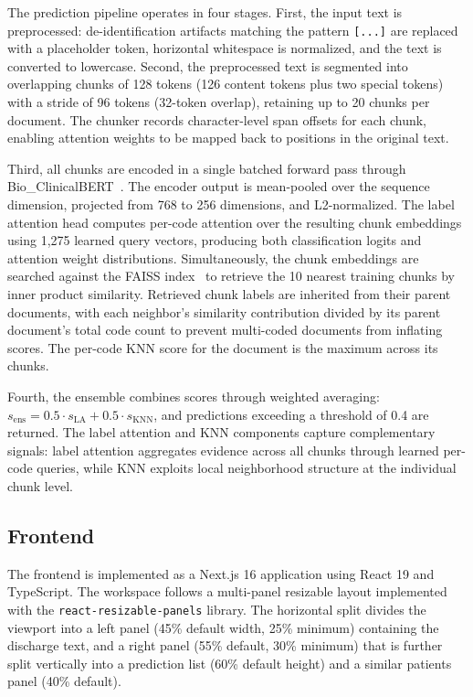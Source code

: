 \documentclass[conference]{IEEEtran}
\begin{document}
The prediction pipeline operates in four stages. First, the input text is preprocessed: de-identification artifacts matching the pattern \texttt{[\textasteriskcentered\textasteriskcentered...\textasteriskcentered\textasteriskcentered]} are replaced with a placeholder token, horizontal whitespace is normalized, and the text is converted to lowercase. Second, the preprocessed text is segmented into overlapping chunks of 128 tokens (126 content tokens plus two special tokens) with a stride of 96 tokens (32-token overlap), retaining up to 20 chunks per document. The chunker records character-level span offsets for each chunk, enabling attention weights to be mapped back to positions in the original text.

Third, all chunks are encoded in a single batched forward pass through Bio\_ClinicalBERT~\cite{b_clinicalbert}. The encoder output is mean-pooled over the sequence dimension, projected from 768 to 256 dimensions, and L2-normalized. The label attention head computes per-code attention over the resulting chunk embeddings using 1,275 learned query vectors, producing both classification logits and attention weight distributions. Simultaneously, the chunk embeddings are searched against the FAISS index~\cite{b_faiss} to retrieve the 10 nearest training chunks by inner product similarity. Retrieved chunk labels are inherited from their parent documents, with each neighbor's similarity contribution divided by its parent document's total code count to prevent multi-coded documents from inflating scores. The per-code KNN score for the document is the maximum across its chunks.

Fourth, the ensemble combines scores through weighted averaging: $s_{\text{ens}} = 0.5 \cdot s_{\text{LA}} + 0.5 \cdot s_{\text{KNN}}$, and predictions exceeding a threshold of 0.4 are returned. The label attention and KNN components capture complementary signals: label attention aggregates evidence across all chunks through learned per-code queries, while KNN exploits local neighborhood structure at the individual chunk level.

\subsection{Frontend}

The frontend is implemented as a Next.js 16 application using React 19 and TypeScript. The workspace follows a multi-panel resizable layout implemented with the \texttt{react-resizable-panels} library. The horizontal split divides the viewport into a left panel (45\% default width, 25\% minimum) containing the discharge text, and a right panel (55\% default, 30\% minimum) that is further split vertically into a prediction list (60\% default height) and a similar patients panel (40\% default).
\end{document}
